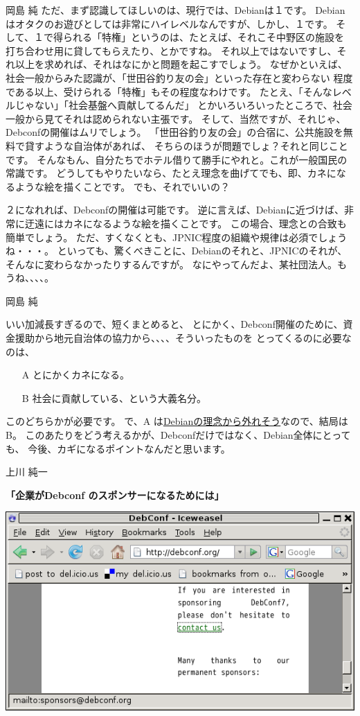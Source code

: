 \documentclass[cjk,dvipdfmx,12pt]{beamer}
\begin{document}
\begin{frame}{岡島 純}
ただ、まず認識してほしいのは、現行では、Debianは１です。
Debianはオタクのお遊びとしては非常にハイレベルなんですが、しかし、１です。
そして、１で得られる「特権」というのは、たとえば、それこそ中野区の施設を
打ち合わせ用に貸してもらえたり、とかですね。
それ以上ではないですし、それ以上を求めれば、それはなにかと問題を起こすでしょう。
なぜかといえば、社会一般からみた認識が、「世田谷釣り友の会」といった存在と変わらない
程度である以上、受けられる「特権」もその程度なわけです。
たとえ、「そんなレベルじゃない」「社会基盤へ貢献してるんだ」
とかいろいろいったところで、社会一般から見てそれは認められない主張です。
そして、当然ですが、それじゃ、Debconfの開催はムリでしょう。
「世田谷釣り友の会」の合宿に、公共施設を無料で貸すような自治体があれば、
そちらのほうが問題でしょ？それと同じことです。
そんなもん、自分たちでホテル借りて勝手にやれと。これが一般国民の常識です。
どうしてもやりたいなら、たとえ理念を曲げてでも、即、カネになるような絵を描くことです。
でも、それでいいの？

２になれれば、Debconfの開催は可能です。
逆に言えば、Debianに近づけば、非常に迂遠にはカネになるような絵を描くことです。
この場合、理念との合致も簡単でしょう。
ただ、すくなくとも、JPNIC程度の組織や規律は必須でしょうね・・・。
といっても、驚くべきことに、Debianのそれと、JPNICのそれが、そんなに変わらなかったりするんですが。
なにやってんだよ、某社団法人。もうね、、、、。

\end{frame}\begin{frame}{岡島 純}

いい加減長すぎるので、短くまとめると、
とにかく、Debconf開催のために、資金援助から地元自治体の協力から、、、、そういったものを
とってくるのに必要なのは、
\begin{itemize}
 \item[A] とにかくカネになる。
 \item[B] 社会に貢献している、という大義名分。
\end{itemize}
このどちらかが必要です。
で、A は\underline{Debianの理念から外れそう}なので、結局はB。
このあたりをどう考えるかが、Debconfだけではなく、Debian全体にとっても、
今後、カギになるポイントなんだと思います。

\end{frame}\begin{frame}{上川 純一}

\textbf{「企業がDebconf のスポンサーになるためには」}

  \includegraphics[width=1\hsize]{image200707/debconf-sponsor.png}


\end{frame}
\end{document}
